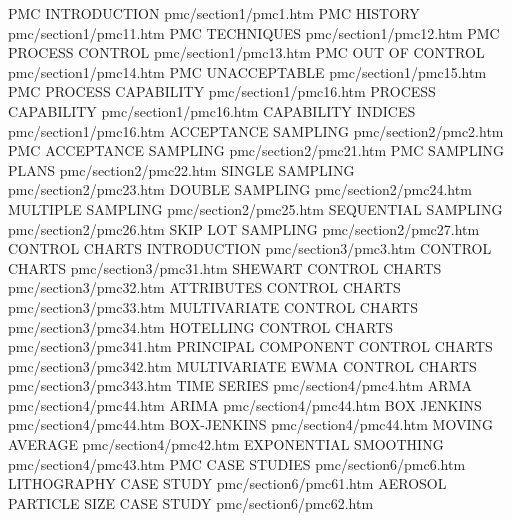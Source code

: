 PMC INTRODUCTION                        pmc/section1/pmc1.htm
PMC HISTORY                             pmc/section1/pmc11.htm
PMC TECHNIQUES                          pmc/section1/pmc12.htm
PMC PROCESS CONTROL                     pmc/section1/pmc13.htm
PMC OUT OF CONTROL                      pmc/section1/pmc14.htm
PMC UNACCEPTABLE                        pmc/section1/pmc15.htm
PMC PROCESS CAPABILITY                  pmc/section1/pmc16.htm
PROCESS CAPABILITY                      pmc/section1/pmc16.htm
CAPABILITY INDICES                      pmc/section1/pmc16.htm
ACCEPTANCE SAMPLING                     pmc/section2/pmc2.htm
PMC ACCEPTANCE SAMPLING                 pmc/section2/pmc21.htm
PMC SAMPLING PLANS                      pmc/section2/pmc22.htm
SINGLE SAMPLING                         pmc/section2/pmc23.htm
DOUBLE SAMPLING                         pmc/section2/pmc24.htm
MULTIPLE SAMPLING                       pmc/section2/pmc25.htm
SEQUENTIAL SAMPLING                     pmc/section2/pmc26.htm
SKIP LOT SAMPLING                       pmc/section2/pmc27.htm
CONTROL CHARTS INTRODUCTION             pmc/section3/pmc3.htm
CONTROL CHARTS                          pmc/section3/pmc31.htm
SHEWART CONTROL CHARTS                  pmc/section3/pmc32.htm
ATTRIBUTES CONTROL CHARTS               pmc/section3/pmc33.htm
MULTIVARIATE CONTROL CHARTS             pmc/section3/pmc34.htm
HOTELLING CONTROL CHARTS                pmc/section3/pmc341.htm
PRINCIPAL COMPONENT CONTROL CHARTS      pmc/section3/pmc342.htm
MULTIVARIATE EWMA CONTROL CHARTS        pmc/section3/pmc343.htm
TIME SERIES                             pmc/section4/pmc4.htm
ARMA                                    pmc/section4/pmc44.htm
ARIMA                                   pmc/section4/pmc44.htm
BOX JENKINS                             pmc/section4/pmc44.htm
BOX-JENKINS                             pmc/section4/pmc44.htm
MOVING AVERAGE                          pmc/section4/pmc42.htm
EXPONENTIAL SMOOTHING                   pmc/section4/pmc43.htm
PMC CASE STUDIES                        pmc/section6/pmc6.htm
LITHOGRAPHY CASE STUDY                  pmc/section6/pmc61.htm
AEROSOL PARTICLE SIZE CASE STUDY        pmc/section6/pmc62.htm

